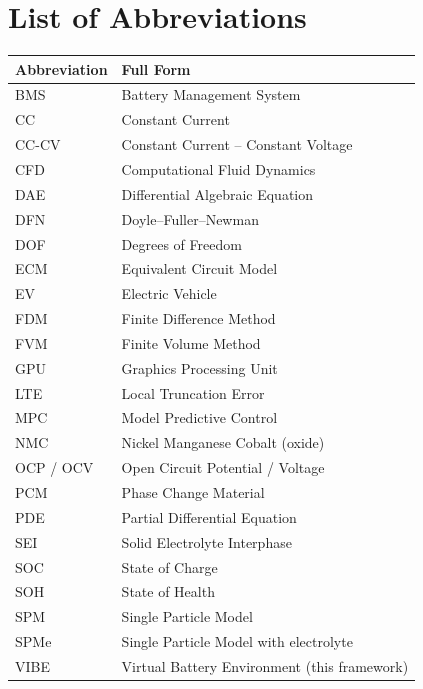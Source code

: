 \tableofcontents
\newpage
\listoffigures
{}
\newpage
\listoftables
{}
\newpage

\chapter*{List of Abbreviations}
\thispagestyle{plain}

\begin{longtable}{p{3.5cm} p{11cm}}
\toprule
\textbf{Abbreviation} & \textbf{Full Form} \\
\midrule
BMS     & Battery Management System \\
CC      & Constant Current \\
CC-CV   & Constant Current -- Constant Voltage \\
CFD     & Computational Fluid Dynamics \\
DAE     & Differential Algebraic Equation \\
DFN     & Doyle--Fuller--Newman \\
DOF     & Degrees of Freedom \\
ECM     & Equivalent Circuit Model \\
EV      & Electric Vehicle \\
FDM     & Finite Difference Method \\
FVM     & Finite Volume Method \\
GPU     & Graphics Processing Unit \\
LTE     & Local Truncation Error \\
MPC     & Model Predictive Control \\
NMC     & Nickel Manganese Cobalt (oxide) \\
OCP / OCV & Open Circuit Potential / Voltage \\
PCM     & Phase Change Material \\
PDE     & Partial Differential Equation \\
SEI     & Solid Electrolyte Interphase \\
SOC     & State of Charge \\
SOH     & State of Health \\
SPM     & Single Particle Model \\
SPMe    & Single Particle Model with electrolyte \\
VIBE    & Virtual Battery Environment (this framework) \\
\bottomrule
\end{longtable}

